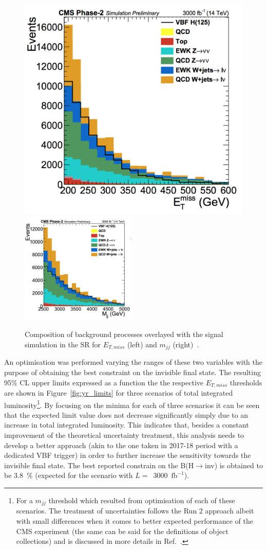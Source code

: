 \begin{figure}[htbp]
  \centering
    \includegraphics[width=0.49 \textwidth]{Conclusion/YR_MET.png}
    \includegraphics[width=0.49\textwidth]{Conclusion/YR_mjj.png}

  \caption{Composition of background processes overlayed with the signal simulation in the SR for $E_{T,miss}$ (left) and $m_{jj}$ (right)~\cite{yellow_report}.}
  \label{fig:yr_distributions}
\end{figure}
\hspace{10pt} An optimisation was performed varying the ranges of these two variables with the purpose of obtaining the best constraint on the invisible final state. The resulting 95\% CL upper limits expressed as a function the the respective $E_{T,miss}$ thresholds are shown in Figure~\ref{fig:yr_limits} for three scenarios of total integrated luminosity\footnote{For a $m_{jj}$ threshold which resulted from optimisation of each of these scenarios. The treatment of uncertainties follows the Run 2 approach albeit with small differences when it comes to better expected performance of the CMS experiment (the same can be said for the definitions of object collections) and is discussed in more details in Ref.~\cite{yellow_report}.}. By focusing on the minima for each of three scenarios it can be seen that the expected limit value does not decrease significantly simply due to an increase in total integrated luminosity. This indicates that, besides a constant improvement of the theoretical uncertainty treatment, this analysis needs to develop a better approach (akin to the one taken in 2017-18 period with a dedicated VBF trigger) in order to further increase the sensitivity towards the invisible final state. The best reported constrain on the B(H$\rightarrow$inv) is obtained to be 3.8~\% (expected for the scenario with $L =$~3000~$\text{fb}^{-1}$).

